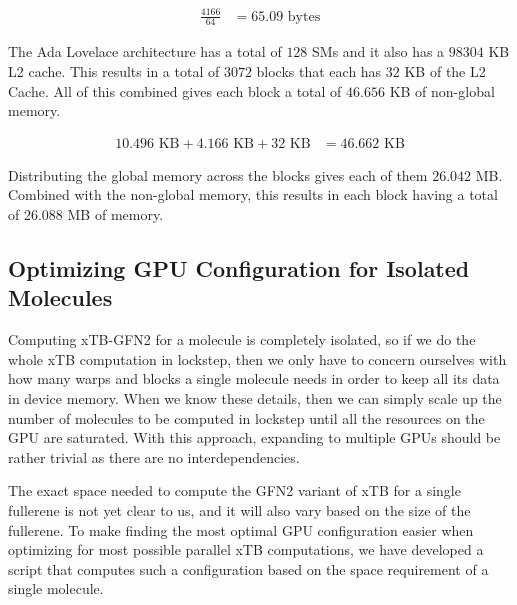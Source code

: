 \begin{equation}
\begin{split}
  \frac{4166}{64} &= 65.09 \text{ bytes}
\end{split}
\end{equation}

The Ada Lovelace architecture has a total of $128$ SMs and it also has a $98304$ KB L2 cache. This results in a total of $3072$ blocks that each has $32$ KB of the L2 Cache. All of this combined gives each block a total of $46.656$ KB of non-global memory.

\begin{equation}
\begin{split}
  10.496 \text{ KB} + 4.166 \text{ KB} + 32 \text{ KB} &= 46.662 \text{ KB}
\end{split}
\end{equation}

Distributing the global memory across the blocks gives each of them $26.042$ MB. Combined with the non-global memory, this results in each block having a total of $26.088$ MB of memory.

\subsection{Optimizing GPU Configuration for Isolated Molecules}

Computing xTB-GFN2 for a molecule is completely isolated, so if we do the whole xTB computation in lockstep, then we only have to concern ourselves with how many warps and blocks a single molecule needs in order to keep all its data in device memory. When we know these details, then we can simply scale up the number of molecules to be computed in lockstep until all the resources on the GPU are saturated. With this approach, expanding to multiple GPUs should be rather trivial as there are no interdependencies.

The exact space needed to compute the GFN2 variant of xTB for a single fullerene is not yet clear to us, and it will also vary based on the size of the fullerene. To make finding the most optimal GPU configuration easier when optimizing for most possible parallel xTB computations, we have developed a script that computes such a configuration based on the space requirement of a single molecule.

